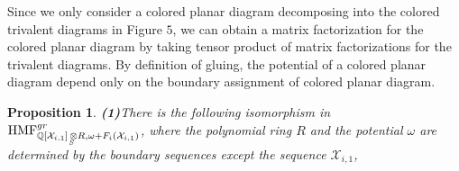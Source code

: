 \documentclass[10pt]{amsart}
\theoremstyle{break}
\newtheorem{pro}[de]{Proposition}
\begin{document}
Since we only consider a colored planar diagram decomposing into the colored trivalent diagrams in Figure $5$, we can obtain a matrix factorization for the colored planar diagram by taking tensor product of matrix factorizations for the trivalent diagrams.
By definition of gluing, the potential of a colored planar diagram depend only on the boundary assignment of colored planar diagram.
\begin{pro}
{\rm\bf (1)}There is the following isomorphism in ${{\mathrm{HMF}}}^{gr}_{{{\mathbb{Q}}} [\mathcal{X}_{i,1}]{{\,\otimes\hspace{-0.7em}\raisebox{-0.5ex}{${}_{{}_{S}}$}\,}} R,\omega +F_i(\mathcal{X}_{i,1})}$, where the polynomial ring $R$ 
and the potential $\omega$ are determined by the boundary sequences except the sequence $\mathcal{X}_{i,1}$,


\end{pro}
\end{document}
